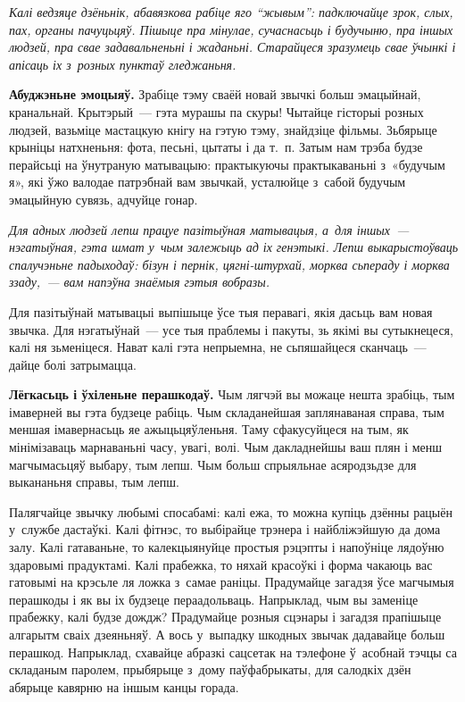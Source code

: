 \emph{Калі ведзяце дзёньнік, абавязкова рабіце яго ``жывым'': падключайце зрок, слых, пах, органы пачуцьцяў. Пішыце пра мінулае, сучаснасьць і будучыню, пра іншых людзей, пра свае задавальненьні і жаданьні. Старайцеся зразумець свае ўчынкі і апісаць іх з~розных пунктаў гледжаньня.}

\textbf{Абуджэньне эмоцыяў.} Зрабіце тэму сваёй новай звычкі больш эмацыйнай, кранальнай. Крытэрый~--- гэта мурашы па скуры! Чытайце гісторыі розных людзей, вазьміце мастацкую кнігу на гэтую тэму, знайдзіце фільмы. Зьбярыце крыніцы натхненьня: фота, песьні, цытаты і да т.~п. Затым нам трэба будзе перайсьці на ўнутраную матывацыю: практыкуючы практыкаваньні з~«будучым я», які ўжо валодае патрэбнай вам звычкай, усталюйце з~сабой будучым эмацыйную сувязь, адчуйце гонар.

\emph{Для адных людзей лепш працуе пазітыўная матывацыя, а~для іншых~--- нэгатыўная, гэта шмат у~чым залежыць ад іх генэтыкі. Лепш выкарыстоўваць спалучэньне падыходаў: бізун і пернік, цягні-штурхай, морква сьпераду і морква ззаду,~--- вам напэўна знаёмыя гэтыя вобразы.}

Для пазітыўнай матывацыі выпішыце ўсе тыя перавагі, якія дасьць вам новая звычка. Для нэгатыўнай~--- усе тыя праблемы і пакуты, зь якімі вы сутыкнецеся, калі ня зьменіцеся. Нават калі гэта непрыемна, не сьпяшайцеся сканчаць~--- дайце болі затрымацца.


\textbf{Лёгкасьць і ўхіленьне перашкодаў.} Чым лягчэй вы можаце нешта зрабіць, тым імаверней вы гэта будзеце рабіць. Чым складанейшая заплянаваная справа, тым меншая імавернасьць яе ажыцьцяўленьня. Таму сфакусуйцеся на тым, як мінімізаваць марнаваньні часу, увагі, волі. Чым дакладнейшы ваш плян і менш магчымасьцяў выбару, тым лепш. Чым больш спрыяльнае асяродзьдзе для выкананьня справы, тым лепш.

Палягчайце звычку любымі спосабамі: калі ежа, то можна купіць дзённы рацыён у~службе дастаўкі. Калі фітнэс, то выбірайце трэнера і найбліжэйшую да дома залу. Калі гатаваньне, то калекцыянуйце простыя рэцэпты і напоўніце лядоўню здаровымі прадуктамі. Калі прабежка, то няхай красоўкі і форма чакаюць вас гатовымі на крэсьле ля ложка з~самае раніцы. Прадумайце загадзя ўсе магчымыя перашкоды і як вы іх будзеце пераадольваць. Напрыклад, чым вы заменіце прабежку, калі будзе дождж? Прадумайце розныя сцэнары і загадзя прапішыце алгарытм сваіх дзеяньняў. А вось у~выпадку шкодных звычак дадавайце больш перашкод. Напрыклад, схавайце абразкі сацсетак на тэлефоне ў~асобнай тэчцы са складаным паролем, прыбярыце з~дому паўфабрыкаты, для салодкіх дзён абярыце кавярню на іншым канцы горада.

